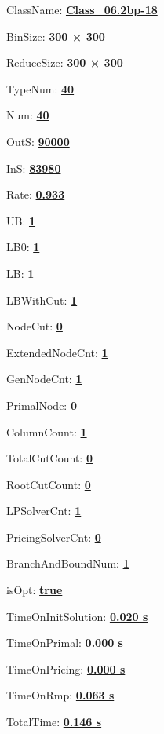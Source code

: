 \documentclass[11pt]{article}
\begin{document}
\pagestyle{empty}


ClassName: \underline{\textbf{Class_06.2bp-18}}
\par
BinSize: \underline{\textbf{300 × 300}}
\par
ReduceSize: \underline{\textbf{300 × 300}}
\par
TypeNum: \underline{\textbf{40}}
\par
Num: \underline{\textbf{40}}
\par
OutS: \underline{\textbf{90000}}
\par
InS: \underline{\textbf{83980}}
\par
Rate: \underline{\textbf{0.933}}
\par
UB: \underline{\textbf{1}}
\par
LB0: \underline{\textbf{1}}
\par
LB: \underline{\textbf{1}}
\par
LBWithCut: \underline{\textbf{1}}
\par
NodeCut: \underline{\textbf{0}}
\par
ExtendedNodeCnt: \underline{\textbf{1}}
\par
GenNodeCnt: \underline{\textbf{1}}
\par
PrimalNode: \underline{\textbf{0}}
\par
ColumnCount: \underline{\textbf{1}}
\par
TotalCutCount: \underline{\textbf{0}}
\par
RootCutCount: \underline{\textbf{0}}
\par
LPSolverCnt: \underline{\textbf{1}}
\par
PricingSolverCnt: \underline{\textbf{0}}
\par
BranchAndBoundNum: \underline{\textbf{1}}
\par
isOpt: \underline{\textbf{true}}
\par
TimeOnInitSolution: \underline{\textbf{0.020 s}}
\par
TimeOnPrimal: \underline{\textbf{0.000 s}}
\par
TimeOnPricing: \underline{\textbf{0.000 s}}
\par
TimeOnRmp: \underline{\textbf{0.063 s}}
\par
TotalTime: \underline{\textbf{0.146 s}}
\par
\newpage
\end{document}

